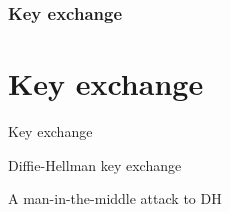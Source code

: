 \section{Key exchange}
\part{Key exchange}

\begin{frame}{Key exchange}

\end{frame}

\begin{frame}{Diffie-Hellman key exchange}

\end{frame}

\begin{frame}{A man-in-the-middle attack to DH}

\end{frame}
